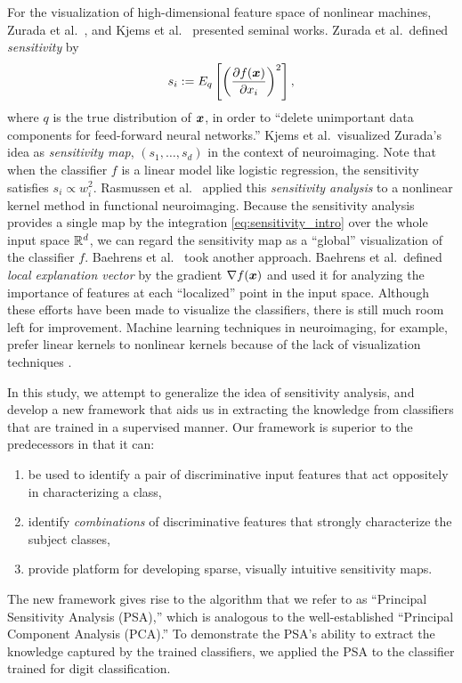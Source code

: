 For the visualization of high-dimensional feature space of nonlinear machines,
Zurada et al.\ \cite{Zurada1994,Zurada1997},  and Kjems et al.\ \cite{Kjems2002}
presented seminal works.
%
Zurada et al.\ defined \textit{sensitivity} by
\begin{equation}
 \label{eq:sensitivity_intro}
 s_i := E_q \left[ \left(\frac{\partial f(\mbox{\boldmath $x$})}{\partial x_i} \right)^2 \right],
\end{equation}
where $q$ is the true distribution of $\mbox{\boldmath $x$}$,
in order to ``delete unimportant data components for feed-forward neural networks.''
Kjems et al.\ visualized Zurada's idea as \textit{sensitivity map}, $\left(s_1, \dots, s_d\right)$
in the context of neuroimaging.
%
Note that when the classifier $f$ is a linear model like logistic
regression, the sensitivity satisfies $s_i \propto w_i^2$.
%
Rasmussen et al.\ \cite{Rasmussen2011} applied this \textit{sensitivity analysis}
to a nonlinear kernel method in functional neuroimaging.
%
Because the sensitivity analysis provides a single map by the
integration \eqref{eq:sensitivity_intro} over the
whole input space $\mathbb{R}^{d}$, we can regard the sensitivity map as a
``global'' visualization of the classifier $f$.
%
Baehrens et al.\ \cite{Baehrens2010} took another approach.
%
Baehrens et al.\ defined \textit{local explanation vector} by the
gradient $\nabla f (\mbox{\boldmath $x$})$ and used it for
analyzing the importance of features at each ``localized'' point in the
input space.
%
Although these efforts have been made to visualize the
classifiers,
there is still much room left for improvement.
%
Machine learning techniques in neuroimaging, for example,
prefer linear kernels to nonlinear kernels because of the lack of
visualization techniques \cite{LaConte2005}.

In this study, we attempt to  generalize the idea of sensitivity
analysis, and develop a new framework that aids us in extracting the
knowledge from classifiers that are trained in a supervised manner.
%
Our framework is superior to the predecessors in that it can:
\begin{enumerate}
 \item be used to identify a pair of discriminative input
       features that act oppositely in characterizing a class,
 \item identify \textit{combinations} of discriminative features that strongly
       characterize the subject classes,
 \item provide platform for developing sparse, visually intuitive
       sensitivity maps.
\end{enumerate}
%
The new framework gives rise to the algorithm that we refer
to as ``Principal Sensitivity Analysis (PSA),'' which is analogous to
the well-established ``Principal Component Analysis (PCA).''
%
To demonstrate the PSA's ability to extract the knowledge captured by
the trained classifiers, we applied the PSA to the classifier trained
for digit classification.

